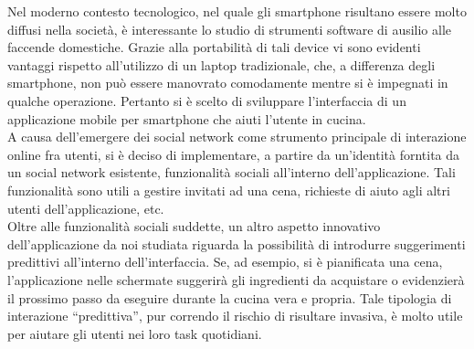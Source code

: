 Nel moderno contesto tecnologico, nel quale gli smartphone risultano essere molto
diffusi nella società, è interessante lo studio di strumenti software di ausilio
alle faccende domestiche. Grazie alla portabilità di tali device vi sono evidenti
vantaggi rispetto all'utilizzo di un laptop tradizionale, che, a differenza degli smartphone, non può essere
manovrato comodamente mentre si è impegnati in qualche operazione. Pertanto si è scelto di sviluppare l'interfaccia
di un applicazione mobile per smartphone che aiuti l'utente in cucina.
\\
A causa dell'emergere dei social network come strumento principale di interazione online fra utenti, si è
deciso di implementare, a partire da un'identità forntita da un social network esistente, funzionalità sociali
all'interno dell'applicazione. Tali funzionalità sono utili a gestire invitati ad una cena, richieste di aiuto
agli altri utenti dell'applicazione, etc.
\\
Oltre alle funzionalità sociali suddette, un altro aspetto innovativo dell'applicazione da noi studiata riguarda
la possibilità di introdurre suggerimenti predittivi all'interno dell'interfaccia. Se, ad esempio, si è pianificata una cena,
l'applicazione nelle schermate suggerirà gli ingredienti da acquistare o evidenzierà il prossimo passo da eseguire durante
la cucina vera e propria. Tale tipologia di interazione ``predittiva'', pur correndo il rischio di risultare invasiva,
è molto utile per aiutare gli utenti nei loro task quotidiani.